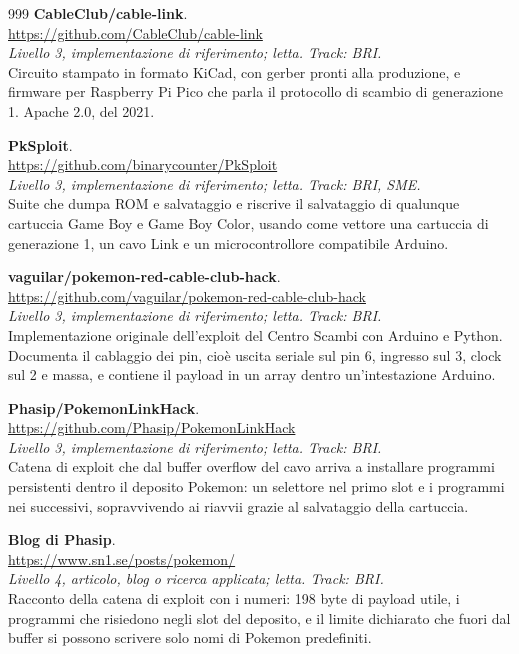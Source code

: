 \begin{thebibliography}{999}
  \textbf{CableClub/cable-link}.
  \\ \url{https://github.com/CableClub/cable-link}
  \\ \emph{Livello 3, implementazione di riferimento; letta. Track: BRI.}
  \\ Circuito stampato in formato KiCad, con gerber pronti alla produzione, e firmware per Raspberry Pi Pico che parla il protocollo di scambio di generazione 1. Apache 2.0, del 2021.

  \textbf{PkSploit}.
  \\ \url{https://github.com/binarycounter/PkSploit}
  \\ \emph{Livello 3, implementazione di riferimento; letta. Track: BRI, SME.}
  \\ Suite che dumpa ROM e salvataggio e riscrive il salvataggio di qualunque cartuccia Game Boy e Game Boy Color, usando come vettore una cartuccia di generazione 1, un cavo Link e un microcontrollore compatibile Arduino.

  \textbf{vaguilar/pokemon-red-cable-club-hack}.
  \\ \url{https://github.com/vaguilar/pokemon-red-cable-club-hack}
  \\ \emph{Livello 3, implementazione di riferimento; letta. Track: BRI.}
  \\ Implementazione originale dell'exploit del Centro Scambi con Arduino e Python. Documenta il cablaggio dei pin, cioè uscita seriale sul pin 6, ingresso sul 3, clock sul 2 e massa, e contiene il payload in un array dentro un'intestazione Arduino.

  \textbf{Phasip/PokemonLinkHack}.
  \\ \url{https://github.com/Phasip/PokemonLinkHack}
  \\ \emph{Livello 3, implementazione di riferimento; letta. Track: BRI.}
  \\ Catena di exploit che dal buffer overflow del cavo arriva a installare programmi persistenti dentro il deposito Pokemon: un selettore nel primo slot e i programmi nei successivi, sopravvivendo ai riavvii grazie al salvataggio della cartuccia.

  \textbf{Blog di Phasip}.
  \\ \url{https://www.sn1.se/posts/pokemon/}
  \\ \emph{Livello 4, articolo, blog o ricerca applicata; letta. Track: BRI.}
  \\ Racconto della catena di exploit con i numeri: 198 byte di payload utile, i programmi che risiedono negli slot del deposito, e il limite dichiarato che fuori dal buffer si possono scrivere solo nomi di Pokemon predefiniti.


\end{thebibliography}
